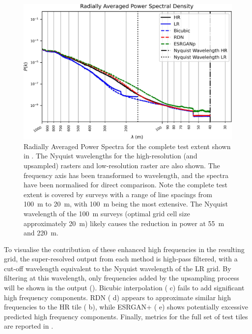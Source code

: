 \begin{figure}[hbtp]
    \centering
    \includegraphics[width=\linewidth]{fig/p1/rapsd.jpg}
    \caption[Power spectra for the test extent]{Radially Averaged Power Spectra for the complete test extent shown in .
        The Nyquist wavelengths for the high-resolution (and upsampled) rasters and low-resolution raster are also shown.
        The frequency axis has been transformed to wavelength, and the spectra have been normalised for direct comparison.
        Note the complete test extent is covered by surveys with a range of line spacings from \qty{100}{\metre} to \qty{20}{\metre}, with \qty{100}{\metre} being the most extensive.
        The Nyquist wavelength of the \qty{100}{\metre} surveys (optimal grid cell size approximately \qty{20}{\metre}) likely causes the reduction in power at \qty{55}{\metre} and \qty{220}{\metre}.
    }
    \label{fig:rapsd}
\end{figure}

To visualise the contribution of these enhanced high frequencies in the resulting grid, the super-resolved output from each method is high-pass filtered, with a cut-off wavelength equivalent to the Nyquist wavelength of the LR grid.
By filtering at this wavelength, only frequencies added by the upsampling process will be shown in the output (). Bicubic interpolation ( c) fails to add significant high frequency components.
RDN\textdaggerdbl{} ( d) appears to approximate similar high frequencies to the HR tile ( b), while ESRGAN+ ( e) shows potentially excessive predicted high frequency components.
Finally, metrics for the full set of test tiles are reported in .


